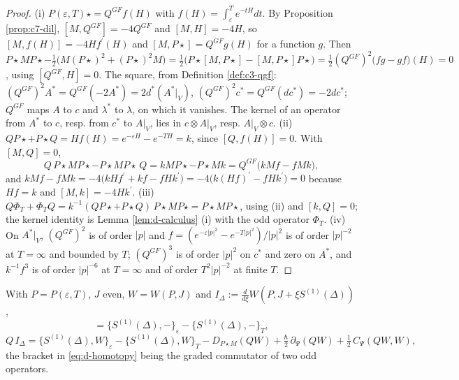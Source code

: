 \begin{proof}
(i) $P(\varepsilon,T)\star=Q^{GF}f(H)$ with $f(H)=\int_\varepsilon^Te^{-tH}dt$. By Proposition \ref{prop:c7-dil}, $[M,Q^{GF}]=-4Q^{GF}$ and $[M,H]=-4H$, so $[M,f(H)]=-4Hf^{\prime}(H)$ and $[M,P\star]=Q^{GF}g(H)$ for a function $g$. Then $P\star MP\star-\tfrac12\big(M(P\star)^2+(P\star)^2M\big)=\tfrac12\big(P\star[M,P\star]-[M,P\star]P\star\big)=\tfrac12(Q^{GF})^2\big(fg-gf\big)(H)=0$, using $[Q^{GF},H]=0$. The square, from Definition \ref{def:c3-qgf}: $(Q^{GF})^2A^*=Q^{GF}(-2A^*)=2d^*(A^*|_V)$, $(Q^{GF})^2c^*=Q^{GF}(dc^*)=-2dc^*$; $Q^{GF}$ maps $A$ to $c$ and $\lambda^*$ to $\lambda$, on which it vanishes. The kernel of an operator from $A^*$ to $c$, resp. from $c^*$ to $A|_V$, lies in $c\otimes A|_V$, resp. $A|_V\otimes c$. (ii) $QP\star+P\star Q=Hf(H)=e^{-\varepsilon H}-e^{-TH}=k$, since $[Q,f(H)]=0$. With $[M,Q]=0$,
\[
Q\,P\star MP\star-P\star MP\star\,Q=kMP\star-P\star Mk=Q^{GF}\big(kMf-fMk\big),
\]
and $kMf-fMk=-4\big(kHf^{\prime}+kf-fHk^{\prime}\big)=-4\big(k(Hf)^{\prime}-fHk^{\prime}\big)=0$ because $Hf=k$ and $[M,k]=-4Hk^{\prime}$. (iii) $Q\Phi_T+\Phi_TQ=k^{-1}(QP\star+P\star Q)\,P\star MP\star=P\star MP\star$, using (ii) and $[k,Q]=0$; the kernel identity is Lemma \ref{lem:d-calculus} (i) with the odd operator $\Phi_T$. (iv) On $A^*|_V$, $(Q^{GF})^2$ is of order $|p|$ and $f=(e^{-\varepsilon|p|^2}-e^{-T|p|^2})/|p|^2$ is of order $|p|^{-2}$ at $T=\infty$ and bounded by $T$; $(Q^{GF})^3$ is of order $|p|^2$ on $c^*$ and zero on $A^*$, and $k^{-1}f^3$ is of order $|p|^{-6}$ at $T=\infty$ and of order $T^2|p|^{-2}$ at finite $T$.
\end{proof}

\begin{proposition}
\label{prop:d-D1b}
With $P=P(\varepsilon,T)$, $J$ even, $W=W(P,J)$ and $I_\Delta:=\frac{d}{d\xi}W(P,J+\xi S^{(1)}(\Delta))$,
\begin{equation}
[Q,D_{P\star M}]=\{S^{(1)}(\Delta),-\}_\varepsilon-\{S^{(1)}(\Delta),-\}_T,
\label{eq:d-homotopy}
\end{equation}
\begin{equation}
Q\,I_\Delta=\{S^{(1)}(\Delta),W\}_\varepsilon-\{S^{(1)}(\Delta),W\}_T-D_{P\star M}(QW)+\tfrac\hbar2\,\partial_\Psi(QW)+\tfrac12\,C_\Psi(QW,W),
\label{eq:d-D1b}
\end{equation}
the bracket in \eqref{eq:d-homotopy} being the graded commutator of two odd operators.
\end{proposition}

